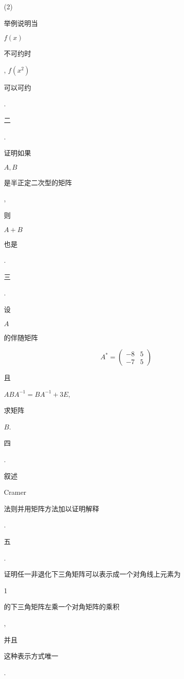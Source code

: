 \documentclass[10pt]{article}
\begin{document}
(2) \begin{CJK}{UTF8}{mj}举例说明当\end{CJK} $f(x)$ \begin{CJK}{UTF8}{mj}不可约时\end{CJK}, $f\left(x^{2}\right)$ \begin{CJK}{UTF8}{mj}可以可约\end{CJK}.

\begin{CJK}{UTF8}{mj}二\end{CJK}. \begin{CJK}{UTF8}{mj}证明如果\end{CJK} $A, B$ \begin{CJK}{UTF8}{mj}是半正定二次型的矩阵\end{CJK}, \begin{CJK}{UTF8}{mj}则\end{CJK} $A+B$ \begin{CJK}{UTF8}{mj}也是\end{CJK}.

\begin{CJK}{UTF8}{mj}三\end{CJK}. \begin{CJK}{UTF8}{mj}设\end{CJK} $A$ \begin{CJK}{UTF8}{mj}的伴随矩阵\end{CJK}
$$
A^{*}=\left(\begin{array}{cc}
-8 & 5 \\
-7 & 5
\end{array}\right)
$$
\begin{CJK}{UTF8}{mj}且\end{CJK} $A B A^{-1}=B A^{-1}+3 E$, \begin{CJK}{UTF8}{mj}求矩阵\end{CJK} $B$.

\begin{CJK}{UTF8}{mj}四\end{CJK}. \begin{CJK}{UTF8}{mj}叙述\end{CJK} Cramer \begin{CJK}{UTF8}{mj}法则并用矩阵方法加以证明解释\end{CJK}.

\begin{CJK}{UTF8}{mj}五\end{CJK}. \begin{CJK}{UTF8}{mj}证明任一非退化下三角矩阵可以表示成一个对角线上元素为\end{CJK} 1 \begin{CJK}{UTF8}{mj}的下三角矩阵左乘一个对角矩阵的乘积\end{CJK}, \begin{CJK}{UTF8}{mj}并且\end{CJK} \begin{CJK}{UTF8}{mj}这种表示方式唯一\end{CJK}.
\end{document}

